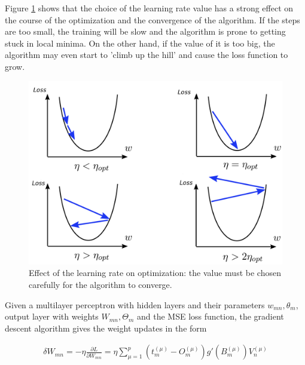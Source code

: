 Figure \ref{learning_rate} shows that the choice of the learning rate value has a strong effect on the course of the optimization and the convergence of the algorithm. If the steps are too small, the training will be slow and the algorithm is prone to getting stuck in local minima. On the other hand, if the value of it is too big, the algorithm may even start to 'climb up the hill' and cause the loss function to grow. \cite{mehlig} 

\newpage

\vspace{3mm}
\begin{figure}[htb]
	\begin{center}
		\includegraphics*[width=14cm, keepaspectratio]{obr/learning_rate.png}
	\end{center}
	\vspace{3mm}
	\caption{Effect of the learning rate on optimization: the value must be chosen carefully for the algorithm to converge. \cite{coors}} 
	\label{learning_rate}
\end{figure}

Given a multilayer perceptron with hidden layers and their parameters $ w_{mn}, \theta_m $, output layer with weights $ W_{mn}, \Theta_m $ and the MSE loss function, the gradient descent algorithm gives the weight updates in the form \cite{mehlig}

\begin{gather}
	\delta W_{mn} = - \eta \frac{\partial L}{\partial W_{mn}} = \eta \sum\limits_{\mu=1}^{p}
	(t_{m}^{(\mu)} - O_{m}^{(\mu)})   g'(B_{m}^{(\mu)})     V_{n}^{(\mu)}
\end{gather}

